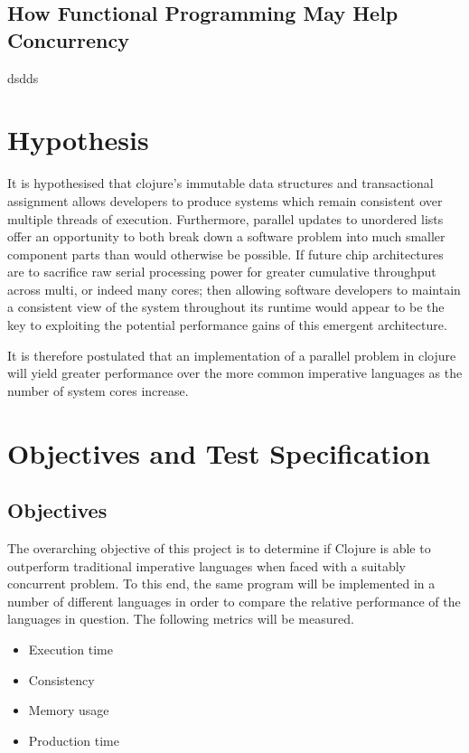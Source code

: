 \documentclass[12pt,a4paper]{article}
\begin{document}
\subsection{How Functional Programming May Help Concurrency}


\cite{promisesOfFunctionalProgramming}
\cite{theFreeLunchIsOver}
\cite{concurrencyChallenges}
dsdds

\newpage
\section{Hypothesis}

It is hypothesised that clojure's immutable data structures and transactional assignment allows developers to produce systems which remain consistent over multiple threads of execution. Furthermore, parallel updates to unordered lists offer an opportunity to both   break down a software problem into much smaller component parts than would otherwise be possible. If future chip architectures are to sacrifice raw serial processing power for greater cumulative throughput across multi, or indeed many cores; then allowing software developers to maintain a consistent view of the system throughout its runtime would appear to be the key to exploiting the potential performance gains of this emergent architecture.

It is therefore postulated that an implementation of a parallel problem in clojure will yield greater performance over the more common imperative languages as the number of system cores increase.

\newpage
\section{Objectives and Test Specification}

\subsection{Objectives}

The overarching objective of this project is to determine if Clojure is able to outperform traditional imperative languages when faced with a suitably concurrent problem. To this end, the same program will be implemented in a number of different languages in order to compare the relative performance of the languages in question. The following metrics will be measured.

\begin{itemize} \itemsep0pt
    \item Execution time
    \item Consistency
    \item Memory usage
    \item Production time
\end{itemize}
\end{document}

